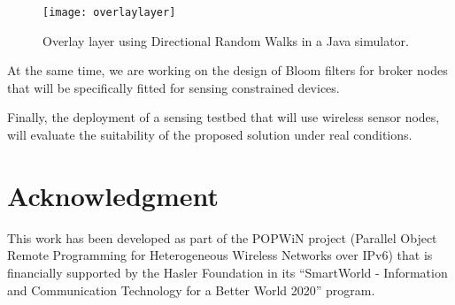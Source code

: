 \documentclass[conference]{IEEEtran}
\begin{document}
\begin{figure}[!h]
\centering
\texttt{[image: overlaylayer]}
\caption{Overlay layer using Directional Random Walks in a Java simulator.}
\vspace{-1.02em}
\label{overlaylayer}
\end{figure}

At the same time, we are working on the design of Bloom filters for broker nodes that will be specifically fitted for sensing constrained devices. 

Finally, the deployment of a sensing testbed that will use wireless sensor nodes, will evaluate the suitability of the proposed solution under real conditions.


\vspace{0.27em}
\section*{Acknowledgment}


This work has been developed as part of the POPWiN project (Parallel Object Remote Programming for Heterogeneous Wireless Networks over IPv6) that is financially supported by the Hasler Foundation in its “SmartWorld - Information and Communication Technology for a Better World 2020” program.



\end{document}
